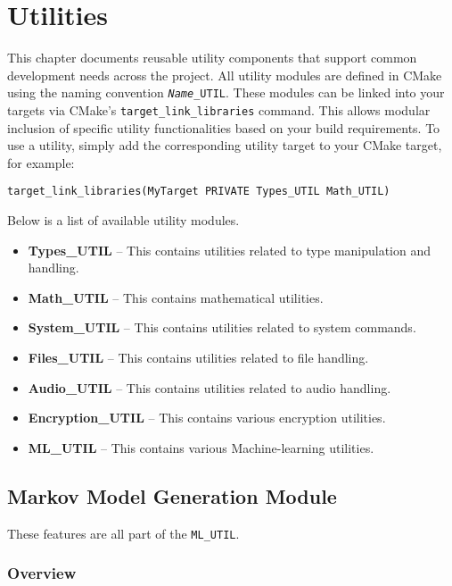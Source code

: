 \chapter{Utilities}
\label{chap:utilities}

This chapter documents reusable utility components that support common development needs across the project. All utility modules are defined in CMake using the naming convention \texttt{\textit{Name}\_UTIL}. These modules can be linked into your targets via CMake's \texttt{target\_link\_libraries} command. This allows modular inclusion of specific utility functionalities based on your build requirements. To use a utility, simply add the corresponding utility target to your CMake target, for example:
\begin{lstlisting}[style=cppstyle]
target_link_libraries(MyTarget PRIVATE Types_UTIL Math_UTIL)
\end{lstlisting}
Below is a list of available utility modules.
\begin{itemize}
	\item \textbf{Types\_UTIL} – This contains utilities related to type manipulation and handling.
	\item \textbf{Math\_UTIL} – This contains mathematical utilities.
	\item \textbf{System\_UTIL} – This contains utilities related to system commands.
	\item \textbf{Files\_UTIL} – This contains utilities related to file handling.
	\item \textbf{Audio\_UTIL} – This contains utilities related to audio handling.
	\item \textbf{Encryption\_UTIL} – This contains various encryption utilities.
	\item \textbf{ML\_UTIL} – This contains various Machine-learning utilities.
\end{itemize}









\section{Markov Model Generation Module}

These features are all part of the \texttt{ML\_UTIL}.

\subsection{Overview}

